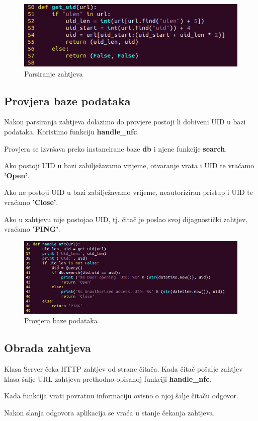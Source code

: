 \documentclass[times, utf8, zavrsni]{fer}
\begin{document}
\begin{figure}[h]
\includegraphics[scale=0.5]{parsiranje.png}
\centering
\caption{Parsiranje zahtjeva}
\centering
\end{figure}

\subsection{Provjera baze podataka}
Nakon parsiranja zahtjeva dolazimo do provjere postoji li dobiveni UID u bazi podataka. Koristimo funkciju \textbf{handle\_nfc}.\par 
Provjera se izvršava preko instancirane baze \textbf{db} i njene funkcije \textbf{search}. \par 
Ako postoji UID u bazi zabilježavamo vrijeme, otvaranje vrata i UID te vraćamo \textbf{'Open'}.\par 
Ako ne postoji UID u bazi zabilježavamo vrijeme, neautoriziran pristup i UID te vraćamo \textbf{'Close'}.\par 
Ako u zahtjevu nije postojao UID, tj. čitač je poslao svoj dijagnostički zahtjev, vraćamo \textbf{'PING'}. 
\begin{figure}[h]
\includegraphics[scale=0.5]{baza.png}
\centering
\caption{Provjera baze podataka}
\centering
\end{figure}

\subsection{Obrada zahtjeva}
Klasa Server čeka HTTP zahtjev od strane čitača. Kada čitač pošalje zahtjev klasa šalje URL zahtjeva prethodno opisanoj funkciji \textbf{handle\_nfc}. \par
Kada funkcija vrati povratnu informaciju ovisno o njoj šalje čitaču odgovor.\par 
Nakon slanja odgovora aplikacija se vraća u stanje čekanja zahtjeva.
\end{document}
